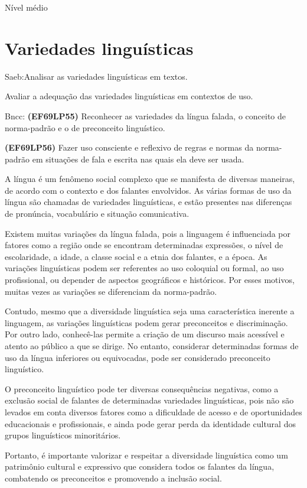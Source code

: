 {Nível médio

\pagestyle{port}
\chapter{Variedades linguísticas}

Saeb:Analisar as variedades linguísticas em textos.

Avaliar a adequação das variedades linguísticas em contextos de uso.

Bncc: \textbf{(EF69LP55)} Reconhecer as variedades da língua falada, o
conceito de norma-padrão e o de preconceito linguístico.

\textbf{(EF69LP56)} Fazer uso consciente e reflexivo de regras e normas
da norma-padrão em situações de fala e escrita nas quais ela deve ser
usada.

A língua é um fenômeno social complexo que se manifesta de diversas
maneiras, de acordo com o contexto e dos falantes envolvidos. As várias
formas de uso da língua são chamadas de variedades linguísticas, e estão
presentes nas diferenças de pronúncia, vocabulário e situação
comunicativa.

Existem muitas variações da língua falada, pois a linguagem é
influenciada por fatores como a região onde se encontram determinadas
expressões, o nível de escolaridade, a idade, a classe social e a etnia
dos falantes, e a época. As variações linguísticas podem ser referentes
ao uso coloquial ou formal, ao uso profissional, ou depender de aspectos
geográficos e históricos. Por esses motivos, muitas vezes as variações
se diferenciam da norma-padrão.

Contudo, mesmo que a diversidade linguística seja uma característica
inerente a linguagem, as variações linguísticas podem gerar preconceitos
e discriminação. Por outro lado, conhecê-las permite a criação de um
discurso mais acessível e atento ao público a que se dirige. No entanto,
considerar determinadas formas de uso da língua inferiores ou
equivocadas, pode ser considerado preconceito linguístico.

O preconceito linguístico pode ter diversas consequências negativas,
como a exclusão social de falantes de determinadas variedades
linguísticas, pois não são levados em conta diversos fatores como a
dificuldade de acesso e de oportunidades educacionais e profissionais, e
ainda pode gerar perda da identidade cultural dos grupos linguísticos
minoritários.

Portanto, é importante valorizar e respeitar a diversidade linguística
como um patrimônio cultural e expressivo que considera todos os falantes
da língua, combatendo os preconceitos e promovendo a inclusão social.

}
